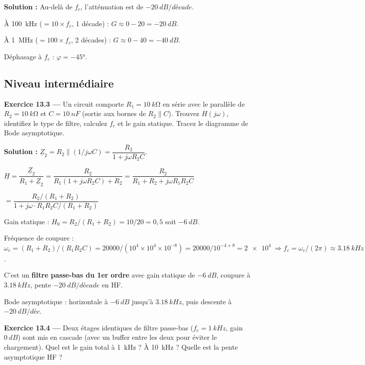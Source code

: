 \documentclass[12pt,a4paper,twoside]{book}
\begin{document}
\begin{pratique}
\textbf{Solution :} Au-delà de $f_c$, l'atténuation est de $-\SI{20}{dB/décade}$.

À \SI{100}{kHz} ($= 10\times f_c$, 1 décade) : $G \approx 0 - 20 = \SI{-20}{dB}$.

À \SI{1}{MHz} ($= 100\times f_c$, 2 décades) : $G \approx 0 - 40 = \SI{-40}{dB}$.

Déphasage à $f_c$ : $\varphi = -45°$.
\end{pratique}

\subsection*{Niveau intermédiaire}

\textbf{Exercice 13.3 ---} Un circuit comporte $R_1 = \SI{10}{k\ohm}$ en série avec le parallèle de $R_2 = \SI{10}{k\ohm}$ et $C = \SI{10}{nF}$ (sortie aux bornes de $R_2 \parallel C$). Trouvez $H(j\omega)$, identifiez le type de filtre, calculez $f_c$ et le gain statique. Tracez le diagramme de Bode asymptotique.

\begin{pratique}
\textbf{Solution :} $\underline{Z}_2 = R_2 \parallel (1/j\omega C) = \dfrac{R_2}{1 + j\omega R_2 C}$.

$\underline{H} = \dfrac{\underline{Z}_2}{R_1 + \underline{Z}_2} = \dfrac{R_2}{R_1(1+j\omega R_2 C) + R_2} = \dfrac{R_2}{R_1 + R_2 + j\omega R_1 R_2 C}$

$= \dfrac{R_2/(R_1+R_2)}{1 + j\omega \cdot R_1 R_2 C/(R_1+R_2)}$

Gain statique : $H_0 = R_2/(R_1+R_2) = 10/20 = 0{,}5$ soit $\SI{-6}{dB}$.

Fréquence de coupure : $\omega_c = (R_1+R_2)/(R_1 R_2 C) = 20000/(10^4\times10^4\times10^{-8}) = 20000/10^{-4+8} = \SI{2e4}{} \Rightarrow f_c = \omega_c/(2\pi) \approx \SI{3.18}{kHz}$.

C'est un \textbf{filtre passe-bas du 1er ordre} avec gain statique de $\SI{-6}{dB}$, coupure à $\SI{3.18}{kHz}$, pente $-\SI{20}{dB/décade}$ en HF.

Bode asymptotique : horizontale à $\SI{-6}{dB}$ jusqu'à $\SI{3.18}{kHz}$, puis descente à $-\SI{20}{dB/déc}$.
\end{pratique}

\textbf{Exercice 13.4 ---} Deux étages identiques de filtre passe-bas ($f_c = \SI{1}{kHz}$, gain $\SI{0}{dB}$) sont mis en cascade (avec un buffer entre les deux pour éviter le chargement). Quel est le gain total à \SI{1}{kHz} ? À \SI{10}{kHz} ? Quelle est la pente asymptotique HF ?
\end{document}
